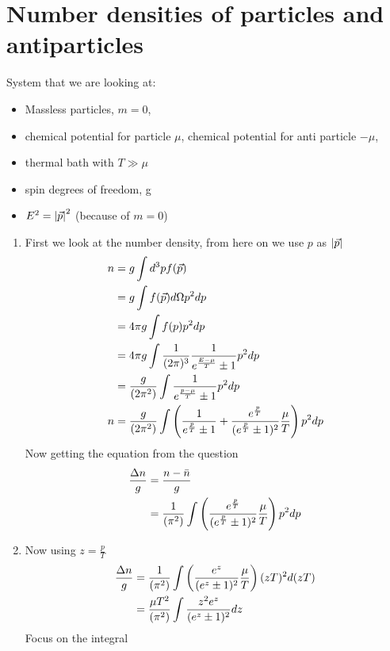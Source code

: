 \section{Number densities of particles and antiparticles}
System that we are looking at: 
\begin{itemize}
\item Massless particles, $m=0$,
\item chemical potential for particle $\mu$, chemical potential for anti particle $-\mu$,
\item thermal bath with $T \gg \mu$
\item spin degrees of freedom, g
\item $E^2 = \abs{\vec{p}}^2$ (because of $m=0$)
\end{itemize}
\begin{enumerate}[label=(\alph*)]
\item First we look at the number density, from here on we use $p$ as $\abs{\vec{p}}$ 
\begin{align}
n 	&= g \int d^{3} p f( \vec{p} ) \\ \notag 
	&= g \int 	f(\vec{p}) d\Omega p^2 dp \notag \\
	&= 4\pi g \int 	f(p) p^2 dp \notag  \\ 
	&= 4\pi g \int 	\frac{1}{(2\pi)^3} \frac{1}{e^{\frac{E-\mu}{T}}\pm 1}p^2 dp \notag  \\ 
	&= \frac{g}{(2\pi^2)} \int \frac{1}{e^{\frac{p-\mu}{T}}\pm 1}p^2 dp \notag \\ 
n 	&= \frac{g}{(2\pi^2)} \int \left( \frac{1}{e^{\frac{p}{T}}\pm 1} + \frac{e^{\frac{p}{T}}}{(e^{\frac{p}{T}}\pm 1)^2}\frac{\mu}{T}\right)p^2 dp  
\end{align}
Now getting the equation from the question
\begin{align}
\frac{\Delta n}{g} 	&= \frac{n-\bar{n}}{g} \\ \notag
				&= \frac{1}{(\pi^2)} \int \left( \frac{e^{\frac{p}{T}}}{(e^{\frac{p}{T}}\pm 1)^2}\frac{\mu}{T}\right)p^2 dp \notag
\end{align}
\item  Now using $z=\frac{p}{T}$
\begin{align}\label{eq:ng}
\frac{\Delta n}{g}	&= \frac{1}{(\pi^2)} \int \left( \frac{e^{z}}{(e^{z}\pm 1)^2} \frac{\mu}{T} \right)(zT)^2 d(zT) \notag \\ 
				&= \frac{\mu T^2}{(\pi^2)} \int \frac{z^2 e^{z}}{(e^{z} \pm 1)^2} dz 
\end{align}
Focus on the integral
\begin{align*}

\end{align*}
\end{enumerate}
